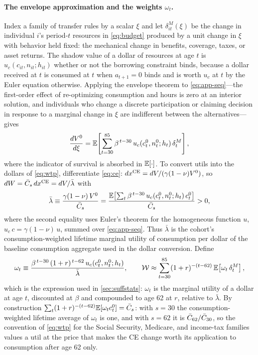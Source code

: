 \paragraph{The envelope approximation and the weights $\omega_t$.}
Index a family of transfer rules by a scalar $\xi$ and let $\delta^{M}_{it}(\xi)$ be the change in individual $i$'s period-$t$ resources in \eqref{eq:budget} produced by a unit change in $\xi$ with behavior held fixed: the mechanical change in benefits, coverage, taxes, or asset returns. The shadow value of a dollar of resources at age $t$ is $u_c(c_{it},n_{it};h_{it})$ whether or not the borrowing constraint binds, because a dollar received at $t$ is consumed at $t$ when $a_{t+1}=0$ binds and is worth $u_c$ at $t$ by the Euler equation otherwise. Applying the envelope theorem to \eqref{eq:app-seq}---the first-order effect of re-optimizing consumption and hours is zero at an interior solution, and individuals who change a discrete participation or claiming decision in response to a marginal change in $\xi$ are indifferent between the alternatives---gives
\begin{equation}\label{eq:app-envelope}
\frac{dV^{0}}{d\xi}={\mathbb E}\!\left[\sum_{t=30}^{85}\beta^{\,t-30}\,u_c(c^{0}_{t},n^{0}_{t};h_{t})\,\delta^{M}_{t}\right],
\end{equation}
where the indicator of survival is absorbed in ${\mathbb E}[\cdot]$. To convert utils into the dollars of \eqref{eq:wtp}, differentiate \eqref{eq:ce}: $dx^{\mathrm{CE}}=dV/(\gamma(1-\nu)V^{0})$, so $dW=\bar{C}_{s}\,dx^{\mathrm{CE}}=dV/\bar\lambda$ with
\begin{equation}\label{eq:app-lambda}
\bar\lambda\equiv\frac{\gamma(1-\nu)\,V^{0}}{\bar{C}_{s}}
=\frac{{\mathbb E}\!\left[\sum_{t}\beta^{\,t-30}\,u_c(c^{0}_{t},n^{0}_{t};h_{t})\,c^{0}_{t}\right]}{\bar{C}_{s}}>0,
\end{equation}
where the second equality uses Euler's theorem for the homogeneous function $u$, $u_c\,c=\gamma(1-\nu)\,u$, summed over \eqref{eq:app-seq}. Thus $\bar\lambda$ is the cohort's consumption-weighted lifetime marginal utility of consumption per dollar of the baseline consumption aggregate used in the dollar conversion. Define
\begin{equation}\label{eq:app-omega}
\omega_{t}\equiv\frac{\beta^{\,t-30}\,(1+r)^{\,t-62}\,u_c(c^{0}_{t},n^{0}_{t};h_{t})}{\bar\lambda},
\qquad
\mathcal{W}\approx\sum_{t=30}^{85}(1+r)^{-(t-62)}\,{\mathbb E}\!\left[\omega_{t}\,\delta^{M}_{t}\right],
\end{equation}
which is the expression used in \autoref{sec:suffstats}: $\omega_t$ is the marginal utility of a dollar at age $t$, discounted at $\beta$ and compounded to age 62 at $r$, relative to $\bar\lambda$. By construction $\sum_t(1+r)^{-(t-62)}{\mathbb E}[\omega_t c^{0}_t]=\bar{C}_{s}$: with $s=30$ the consumption-weighted lifetime average of $\omega_t$ is one, and with $s=62$ it is $\bar{C}_{62}/\bar{C}_{30}$, so the convention of \eqref{eq:wtp} for the Social Security, Medicare, and income-tax families values a util at the price that makes the CE change worth its application to consumption after age 62 only.
